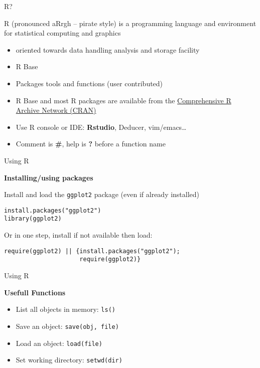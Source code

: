 \begin{frame}{R?}

R (pronounced aRrgh -- pirate style) is a programming language and
environment for statistical computing and graphics

\begin{itemize}
\item
  oriented towards data handling analysis and storage facility
\item
  R Base
\item
  Packages tools and functions (user contributed)
\item
  R Base and most R packages are available from the
  \href{cran.r-project.org}{Comprehensive R Archive Network (CRAN)}
\item
  Use R console or IDE: \textbf{Rstudio}, Deducer, vim/emacs\ldots{}
\item
  Comment is \textbf{\#}, help is \textbf{?} before a function name
\end{itemize}

\end{frame}

\begin{frame}[fragile]{Using R}

\begin{block}{\textbf{Installing/using packages}}

Install and load the \texttt{ggplot2} package (even if already
installed)

\begin{verbatim}
install.packages("ggplot2")
library(ggplot2)
\end{verbatim}

Or in one step, install if not available then load:

\begin{verbatim}
require(ggplot2) || {install.packages("ggplot2");
                     require(ggplot2)}
\end{verbatim}

\end{block}

\end{frame}

\begin{frame}{Using R}

\begin{block}{\textbf{Usefull Functions}}

\begin{itemize}
\item
  List all objects in memory: \texttt{ls()}
\item
  Save an object: \texttt{save(obj,\ file)}
\item
  Load an object: \texttt{load(file)}
\item
  Set working directory: \texttt{setwd(dir)}
\end{itemize}

\end{block}

\end{frame}

